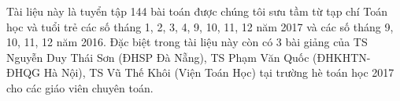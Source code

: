 \documentclass[12pt,a4paper,oneside]{book}
\theoremstyle{nonumberplain}
\begin{document}
	\noindent Tài liệu này là tuyển tập 144 bài toán được chúng tôi sưu tầm từ  tạp chí Toán học và tuổi trẻ các số tháng 1, 2, 3, 4, 9, 10, 11, 12 năm 2017 và các số tháng 9, 10, 11, 12 năm 2016. Đặc biệt trong tài liệu này còn có 3 bài giảng của TS Nguyễn Duy Thái Sơn (ĐHSP Đà Nẵng), TS Phạm Văn Quốc (ĐHKHTN-ĐHQG Hà Nội), TS Vũ Thế Khôi (Viện Toán Học) tại trường hè toán học 2017 cho các giáo viên chuyên toán. 
	
	
	
	
	
	
	
	
	
	
	
	
	
	
	
\end{document}
